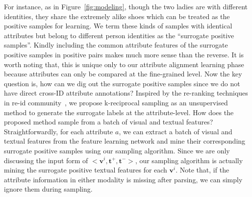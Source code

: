 \documentclass[runningheads]{llncs}
\begin{document}
For instance, as in Figure~\ref{fig:modeling}, though the two ladies are with different identities, they share the extremely alike shoes which can be treated as the positive samples for learning. We term these kinds of samples with identical attributes but belong to different person identities as the ``surrogate positive samples''. Kindly including the common attribute features of the surrogate positive samples in positive pairs makes much more sense than the reverse. It is worth noting that, this is unique only to our attribute alignment learning phase because attributes can only be compared at the fine-grained level. Now the key question is, how can we dig out the surrogate positive samples since we do not have direct cross-ID attribute annotations? Inspired by the re-ranking techniques in re-id community~\cite{garcia2015person,zhong2017re}, we propose k-reciprocal sampling as an unsupervised method to generate the surrogate labels at the attribute-level. How does the proposed method sample from a batch of visual and textual features? Straightforwardly, for each attribute $a$, we can extract a batch of visual and textual features from the feature learning network and mine their corresponding surrogate positive samples using our sampling algorithm. Since we are only discussing the input form of $\big<\boldsymbol{v}^i, \boldsymbol{t}^+, \boldsymbol{t}^-\big>$, our sampling algorithm is actually mining the surrogate positive textual features for each $\boldsymbol{v}^i$. Note that, if the attribute information in either modality is missing after parsing, we can simply ignore them during sampling.


\begin{center}
\end{center}
\end{document}

